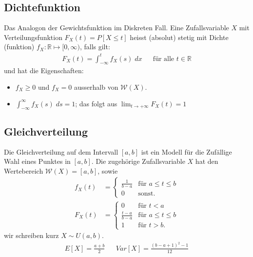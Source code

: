 \documentclass[8pt]{extarticle}
\newcommand{\R}{\mathbb{R}}
\newcommand{\W}{\mathcal{W}}
\newcommand{\ra}{\rightarrow}
\begin{document}
\begin{multicols*}{3}
  \subsection*{Dichtefunktion}
  Das Analogon der Gewichtsfunktion im Diskreten Fall. Eine Zufallsvariable $X$
  mit Verteilungsfunktion $F_X (t) = P[X \leq t]$ heisst  (absolut) stetig mit
  Dichte (funktion) $f_X : \R \mapsto [0, \infty)$, falls gilt:
  \begin{align*}
    F_X (t) = \int_{-\infty}^t f_X (s) \; dx &  & \text{für alle } t \in \R
  \end{align*}
  und hat die Eigenschaften:
  \begin{itemize}
    \item $f_X \geq 0$ und $f_X = 0$ ausserhalb von $\W (X)$.
    \item $\int_{-\infty}^\infty f_X (s) \; ds = 1$;
          das folgt aus $\lim_{t \ra + \infty} F_X (t) = 1$
  \end{itemize}
  \subsection*{Gleichverteilung}
  Die Gleichverteilung auf dem Intervall $[a, b]$ ist ein Modell für die
  Zufällige Wahl eines Punktes in $[a, b]$. Die zugehörige Zufallsvariable $X$
  hat den Wertebereich $\W (X) = [a, b]$, sowie
  \begin{align*}
    f_X (t) & =
    \begin{cases}
      \frac{1}{b-a} & \text{für } a \leq t \leq b \\
      0             & \text{sonst.}
    \end{cases} \\
    F_X (t) & =
    \begin{cases}
      0               & \text{für } t < a           \\
      \frac{t-a}{b-a} & \text{für } a \leq t \leq b \\
      1               & \text{für } t > b.
    \end{cases}
  \end{align*}
  wir schreiben kurz $X \sim U (a, b)$.
  \begin{align*}
    E[X] = \frac{a + b}{2} &  & Var[X] = \frac{ (b - a + 1)^2 - 1}{12}
  \end{align*}

\end{multicols*}
\end{document}
